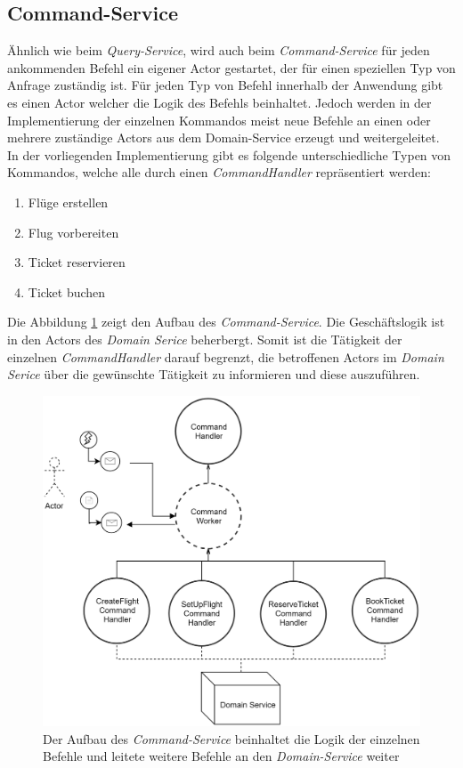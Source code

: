 \subsection{Command-Service}
\label{subsec:implementation:commandService}
 Ähnlich wie beim \textit{Query-Service}, wird auch beim \textit{Command-Service} für jeden ankommenden Befehl ein eigener Actor gestartet, der für einen speziellen Typ von Anfrage zuständig ist. Für jeden Typ von Befehl innerhalb der Anwendung gibt es einen Actor welcher die Logik des Befehls beinhaltet. Jedoch werden in der Implementierung der einzelnen Kommandos meist neue Befehle an einen oder mehrere zuständige Actors aus dem Domain-Service erzeugt und weitergeleitet. \\
 In der vorliegenden Implementierung gibt es folgende unterschiedliche Typen von Kommandos, welche alle durch einen \textit{CommandHandler} repräsentiert werden:
 \begin{enumerate}
   \item Flüge erstellen
   \item Flug vorbereiten
   \item Ticket reservieren
   \item Ticket buchen
 \end{enumerate}
Die Abbildung \ref{fig:implementation:commandActorModel} zeigt den Aufbau des \textit{Command-Service}. Die Geschäftslogik ist in den Actors des \textit{Domain Serice} beherbergt. Somit ist die Tätigkeit der einzelnen \textit{CommandHandler} darauf begrenzt, die betroffenen Actors im \textit{Domain Serice} über die gewünschte Tätigkeit zu informieren und diese auszuführen. 
 \begin{figure}
  \centering
  \includegraphics[width=0.8\linewidth]{gfx/implementation/CommandServiceActorModel}
  \caption{Der Aufbau des \textit{Command-Service} beinhaltet die Logik der einzelnen Befehle und leitete weitere Befehle an den \textit{Domain-Service} weiter }
  \label{fig:implementation:commandActorModel}
\end{figure} 

